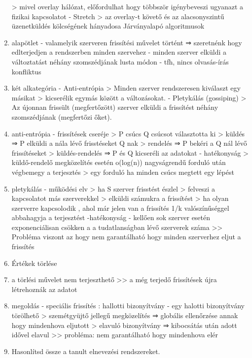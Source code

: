 \documentclass[twoside, a4paper, 12pt]{article}
\begin{document}
\begin{enumerate}
        > mivel overlay hálózat, előfordulhat hogy többször igénybeveszi ugyanazt a fizikai kapcsolatot
        - Stretch 
        > az overlay-t követő és az alacsonyszintű üzenetküldés kölcségének hányadosa
        Járványalapó algoritmusok
    \item alapötlet
        - valamelyik szerveren frissítési művelet történt 
        ⇒ szeretnénk hogy edlterjedjen a rendszerben minden szervehez
        - minden szerver elküldi a változtatást néhány szomszédjának lusta módon
        - tfh, nincs olvasás-írás konfliktus
    \item két alkategória
        - Anti-entrópia
        > Minden szerver rendszeresen kiválaszt egy másikat
        > kicserélik egymás között a változásokat.
        - Pletykálás (gossiping)
        > Az újonnan frissült (megfertőzött) szerver elküldi a frissítést néhány szomszédjának (megfertőzi őket).
    \item anti-entrópia
        - frissítések cseréje
        > P csúcs Q csúcsot választotta ki
        > küldés   ⇒ P elküldi a nála lévő frisstéseket Q nak
        > rendelés ⇒ P bekéri a Q nál lévő frissítéseket
        > küldés-rendelés ⇒ P és Q kicseréli az adatokat
        - hatékonyság
        > küldő-rendelő megközelítés esetén o(log(n)) nagyságrendű forduló után végbemegy a terjesztés
        > egy forduló ha minden csúcs megtett egy lépést
    \item pletykálás
        - működési elv
        > ha S szerver frisstést észlel
        > felveszi a kapcsolatot más szerverekkel 
        > elküldi számukra a frissítést
        > ha olyan szerverre kapcsolodik , ahol már jelen van a frissítés 1/k valószínűséggel abbahagyja a terjesztést
        -hatékonyság
        - kellően sok szerver esetén exponenciálisan csökken a a tudatlanságban lévő szerverek száma
        >> Probléma viszont az hogy nem garantálható hogy minden szerverhez eljut a frissítés 
    \item Értékek törlése
    \item a törlési művelet nem terjeszthető
        >> a még terjedő frissítések újra létrehoznák az adatot
    \item megoldás
        - speciális frissítés : hallotti bizonyítvány
        - egy halotti bizonyítvány törölhető
        > szemétgyüjtő jellegű megközelítés ⇒ globális ellenőrzése annak hogy mindenhova eljutott
        > elavuló bizonyítvány ⇒ kibocsátás után adott idővel elavul >> probléma: nem garantálható hogy mindenhova elér
    \item  Hasonlítsd össze a tanult elnevezési rendszereket.

\end{enumerate}
\end{document}
